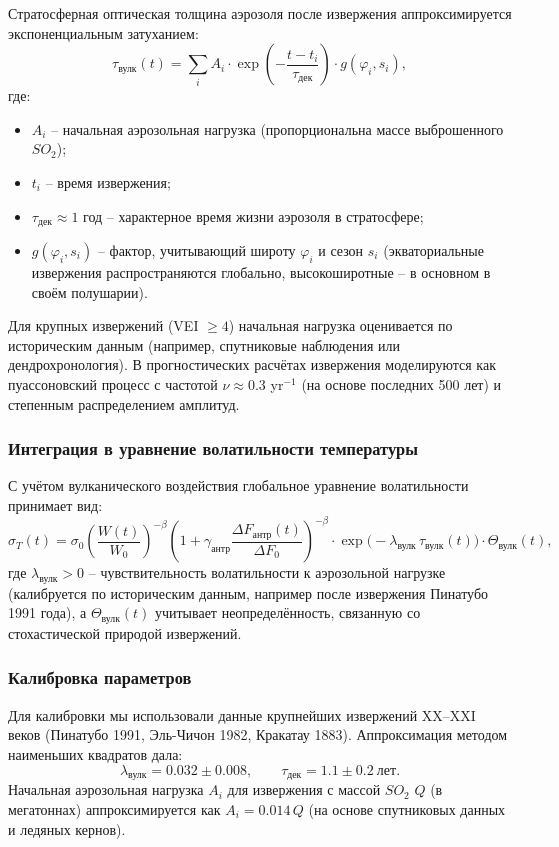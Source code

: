 \documentclass[12pt,a4paper]{article}
\begin{document}
	Стратосферная оптическая толщина аэрозоля после извержения аппроксимируется экспоненциальным затуханием:
	\[
	\tau_{\text{вулк}}(t) = \sum_{i} A_i \cdot \exp\!\left(-\frac{t-t_i}{\tau_{\text{дек}}}\right) \cdot g(\varphi_i, s_i),
	\]
	где:
	\begin{itemize}
		\item \(A_i\) – начальная аэрозольная нагрузка (пропорциональна массе выброшенного \(SO_2\));
		\item \(t_i\) – время извержения;
		\item \(\tau_{\text{дек}} \approx 1\) год – характерное время жизни аэрозоля в стратосфере;
		\item \(g(\varphi_i, s_i)\) – фактор, учитывающий широту \(\varphi_i\) и сезон \(s_i\) (экваториальные извержения распространяются глобально, высокоширотные – в основном в своём полушарии).
	\end{itemize}
	
	Для крупных извержений (VEI \(\ge 4\)) начальная нагрузка оценивается по историческим данным (например, спутниковые наблюдения или дендрохронология). В прогностических расчётах извержения моделируются как пуассоновский процесс с частотой \(\nu \approx 0.3\) yr\(^{-1}\) (на основе последних 500 лет) и степенным распределением амплитуд.
	
	\subsubsection{Интеграция в уравнение волатильности температуры}
	
	С учётом вулканического воздействия глобальное уравнение волатильности принимает вид:
	\[
	\sigma_T(t) = \sigma_0 \left( \frac{W(t)}{W_0} \right)^{-\beta}
	\left(1 + \gamma_{\text{антр}} \frac{\Delta F_{\text{антр}}(t)}{\Delta F_0}\right)^{-\beta}
	\cdot \exp\!\bigl(-\lambda_{\text{вулк}} \,\tau_{\text{вулк}}(t)\bigr) \cdot \Theta_{\text{вулк}}(t),
	\]
	где \(\lambda_{\text{вулк}} > 0\) – чувствительность волатильности к аэрозольной нагрузке (калибруется по историческим данным, например после извержения Пинатубо 1991 года), а \(\Theta_{\text{вулк}}(t)\) учитывает неопределённость, связанную со стохастической природой извержений.
	
	\subsubsection{Калибровка параметров}
	
	Для калибровки мы использовали данные крупнейших извержений XX–XXI веков (Пинатубо 1991, Эль-Чичон 1982, Кракатау 1883). Аппроксимация методом наименьших квадратов дала:
	\[
	\lambda_{\text{вулк}} = 0.032 \pm 0.008, \qquad \tau_{\text{дек}} = 1.1 \pm 0.2\ \text{лет}.
	\]
	Начальная аэрозольная нагрузка \(A_i\) для извержения с массой \(SO_2\) \(Q\) (в мегатоннах) аппроксимируется как \(A_i = 0.014\,Q\) (на основе спутниковых данных и ледяных кернов).
	
\end{document}
